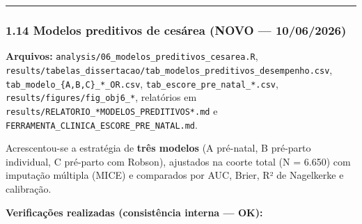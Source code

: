 \documentclass[
]{article}
\begin{document}
\begin{center}\rule{0.5\linewidth}{0.5pt}\end{center}

\hypertarget{modelos-preditivos-de-cesuxe1rea-novo-10062026}{%
\subsubsection{1.14 Modelos preditivos de cesárea (NOVO ---
10/06/2026)}\label{modelos-preditivos-de-cesuxe1rea-novo-10062026}}

\textbf{Arquivos:} \texttt{analysis/06\_modelos\_preditivos\_cesarea.R},
\texttt{results/tabelas\_dissertacao/tab\_modelos\_preditivos\_desempenho.csv},
\texttt{tab\_modelo\_\{A,B,C\}\_*\_OR.csv},
\texttt{tab\_escore\_pre\_natal\_*.csv},
\texttt{results/figures/fig\_obj6\_*}, relatórios em
\texttt{results/RELATORIO\_*MODELOS\_PREDITIVOS*.md} e
\texttt{FERRAMENTA\_CLINICA\_ESCORE\_PRE\_NATAL.md}.

Acrescentou-se a estratégia de \textbf{três modelos} (A pré-natal, B
pré-parto individual, C pré-parto com Robson), ajustados na coorte total
(N = 6.650) com imputação múltipla (MICE) e comparados por AUC, Brier,
R² de Nagelkerke e calibração.

\textbf{Verificações realizadas (consistência interna --- OK):}
\end{document}
